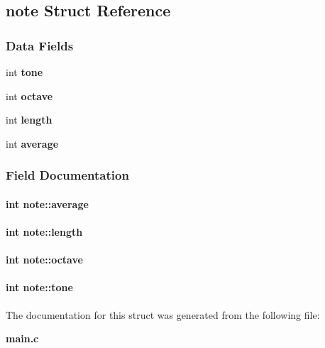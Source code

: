 \subsection{note Struct Reference}
\label{structnote}
\subsubsection*{Data Fields}
\begin{DoxyCompactItemize}
\item 
int {\bf tone}
\item 
int {\bf octave}
\item 
int {\bf length}
\item 
int {\bf average}
\end{DoxyCompactItemize}


\subsubsection{Field Documentation}
\paragraph[{average}]{\setlength{\rightskip}{0pt plus 5cm}int note\+::average}\label{structnote_aed9fb8ec9c20fa4620f928c988dba840}
\paragraph[{length}]{\setlength{\rightskip}{0pt plus 5cm}int note\+::length}\label{structnote_a348563a2eef21d1187cf04f493fedf36}
\paragraph[{octave}]{\setlength{\rightskip}{0pt plus 5cm}int note\+::octave}\label{structnote_a8b58f133e02c3ea4ec40ee641b654dcf}
\paragraph[{tone}]{\setlength{\rightskip}{0pt plus 5cm}int note\+::tone}\label{structnote_a30832d96c968d682e5838b39370a1908}


The documentation for this struct was generated from the following file\+:\begin{DoxyCompactItemize}
\item 
{\bf main.\+c}\end{DoxyCompactItemize}

